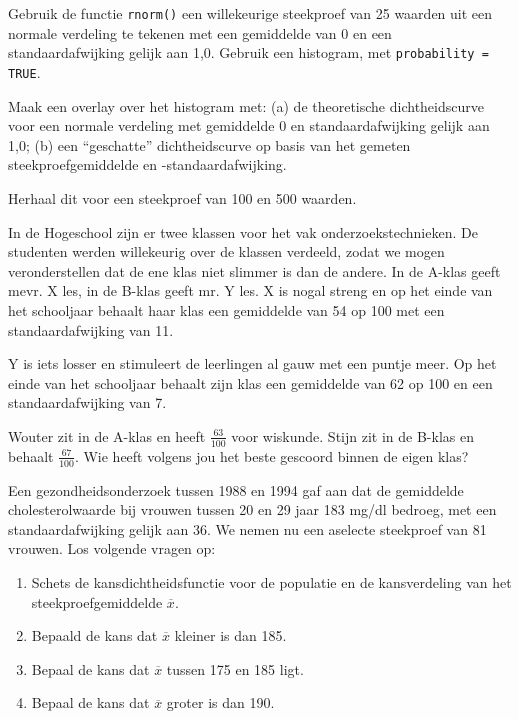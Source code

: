 \begin{exercise}
Gebruik de functie \verb|rnorm()| een willekeurige steekproef van 25 waarden uit een normale verdeling te tekenen met een gemiddelde van 0 en een standaardafwijking gelijk aan 1,0. Gebruik een histogram, met \verb|probability = TRUE|.

Maak een overlay over het histogram met: (a) de theoretische dichtheidscurve voor een normale verdeling met gemiddelde 0 en standaardafwijking gelijk aan 1,0; (b) een ``geschatte'' dichtheidscurve op basis van het gemeten steekproefgemiddelde en -standaardafwijking.

Herhaal dit voor een steekproef van 100 en 500 waarden.
\end{exercise}

\begin{exercise}
  In de  Hogeschool zijn er twee klassen voor het vak onderzoekstechnieken. De studenten werden willekeurig over de klassen verdeeld, zodat we mogen veronderstellen dat de ene klas niet slimmer is dan de andere. In de A-klas geeft mevr. X les, in de B-klas geeft mr. Y les. X is nogal streng en op het einde van het schooljaar behaalt haar klas een gemiddelde van 54 op 100 met een standaardafwijking van 11.

  Y is iets losser en stimuleert de leerlingen al gauw met een puntje meer. Op het einde van het schooljaar behaalt zijn klas een gemiddelde van 62 op 100 en een standaardafwijking van 7.

  Wouter zit in de A-klas en heeft $\frac{63}{100}$ voor wiskunde. Stijn zit in de B-klas en behaalt $\frac{67}{100}$. Wie heeft volgens jou het beste gescoord binnen de eigen klas?
\end{exercise}

\begin{exercise}
  Een gezondheidsonderzoek tussen 1988 en 1994 gaf aan dat de gemiddelde cholesterolwaarde bij vrouwen tussen 20 en 29 jaar 183 mg/dl bedroeg, met een standaardafwijking gelijk aan 36. We nemen nu een aselecte steekproef van 81 vrouwen. Los volgende vragen op:

  \begin{enumerate}[label=\alph*.]
    \item Schets de kansdichtheidsfunctie voor de populatie en de kansverdeling van het steekproefgemiddelde $\overline{x}$.
    \item Bepaald de kans dat $\overline{x}$ kleiner is dan 185.
    \item Bepaal de kans dat $\overline{x}$ tussen 175 en 185 ligt.
    \item Bepaal de kans dat $\overline{x}$ groter is dan 190.
  \end{enumerate}
\end{exercise}

